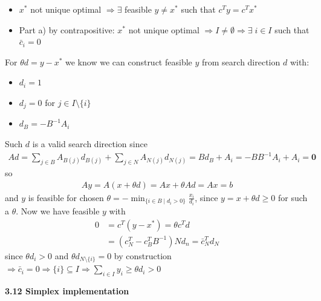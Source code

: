 \documentclass[12pt]{exam}
\begin{document}
\begin{questions}
\begin{parts}
\begin{subparts}
            \begin{itemize}
                \item $x^*$ not unique optimal $\Longrightarrow \exists$ feasible $y\neq x^*$ such that $c^Ty = c^Tx^*$
                \item Part a) by contrapositive: $x^*$ not unique optimal $\Longrightarrow I \neq \emptyset \Longrightarrow \exists\; i\in I$ such that $\bar c_i = 0$
            \end{itemize}
            For $\theta d = y - x^*$ we know we can construct feasible $y$ from search direction $d$ with:
            \begin{itemize}
                \item $d_i = 1$
                \item $d_j = 0$ for $j \in I\setminus\{i\}$
                \item $d_B = -B^{-1}A_i$
            \end{itemize}
            Such $d$ is a valid search direction since 
            \begin{align*}
                Ad = \sum_{j\in B} A_{B(j)}d_{B(j)} + \sum_{j \in N} A_{N(j)}d_{N(j)} = Bd_B + A_i = -BB^{-1}A_i + A_i = \textbf{0}
            \end{align*}
            so 
            \begin{align*}
                Ay = A(x + \theta d) = Ax + \theta Ad = Ax = b
            \end{align*}
            and $y$ is feasible for chosen $\theta = -\min_{\{i \in B \mid d_i > 0\}} \frac{x_i}{d_i}$, since $y = x + \theta d \geq 0$ for such a $\theta$.
            \newline\newline Now we have feasible $y$ with
            \begin{align*}
                0 &= c^T(y - x^*) = \theta c^Td\\
                &= (c^T_N - c^T_BB^{-1})Nd_n = \bar c^T_Nd_N \tag{see derivation in part a}
            \end{align*}
            since $\theta d_i > 0$ and $\theta d_{N\setminus \{i\}} = 0$ by construction $\Longrightarrow \bar c_i = 0 \Longrightarrow \{i\} \subseteq I \Longrightarrow \sum_{i\in I} y_i \geq \theta d_i > 0$
        \end{subparts}
    \end{parts}

    \question \textbf{3.12 Simplex implementation}
    

\end{questions}
\end{document}
